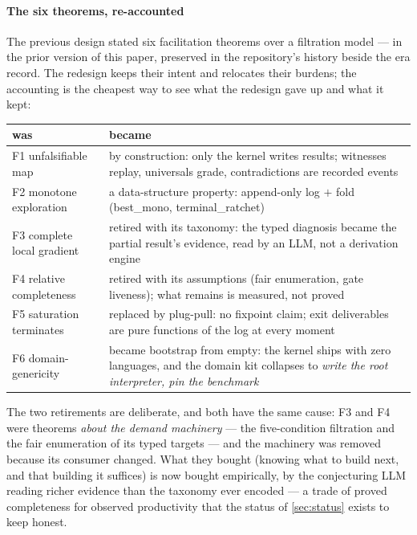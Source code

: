 \paragraph{The six theorems, re-accounted}
The previous design stated six facilitation theorems over a
filtration model --- in the prior version of this paper, preserved
in the repository's history beside the era record. The redesign
keeps their intent and relocates their burdens; the accounting is the
cheapest way to see what the redesign gave up and what it kept:

\begin{center}
\footnotesize
\setlength{\tabcolsep}{3pt}
\begin{tabular}{@{}lp{15.5em}@{}}
\toprule
was & became \\
\midrule
F1 unfalsifiable map & by construction: only the kernel writes
  results; witnesses replay, universals grade, contradictions are
  recorded events \\
F2 monotone exploration & a data-structure property:
  append-only log $+$ fold (\textsf{best\_mono},
  \textsf{terminal\_ratchet}) \\
F3 complete local gradient & retired with its taxonomy: the typed
  diagnosis became the partial result's evidence, read by an LLM,
  not a derivation engine \\
F4 relative completeness & retired with its assumptions (fair
  enumeration, gate liveness); what remains is measured, not
  proved \\
F5 saturation terminates & replaced by plug-pull: no fixpoint
  claim; exit deliverables are pure functions of the log at every
  moment \\
F6 domain-genericity & became bootstrap from empty: the kernel
  ships with zero languages, and the domain kit collapses to
  \emph{write the root interpreter, pin the benchmark} \\
\bottomrule
\end{tabular}
\end{center}

\noindent
The two retirements are deliberate, and both have the same cause:
F3 and F4 were theorems \emph{about the demand machinery} --- the
five-condition filtration and the fair enumeration of its typed
targets --- and the machinery was removed because its consumer
changed. What they bought (knowing what to build next, and that
building it suffices) is now bought empirically, by the conjecturing
LLM reading richer evidence than the taxonomy ever encoded --- a
trade of proved completeness for observed productivity that the
status of \cref{sec:status} exists to keep honest.
